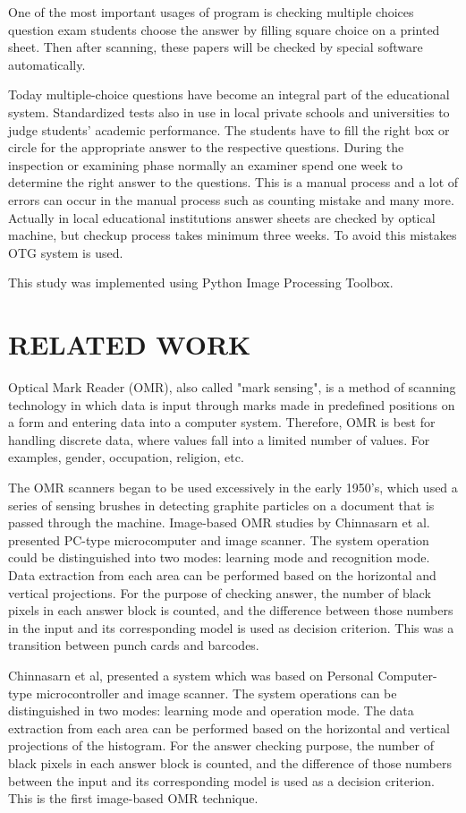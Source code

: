 \documentclass[a4paper,10pt]{article}
\begin{document}
One of the most important usages of program is checking multiple choices question exam students choose the answer by filling square choice on a printed sheet. Then after scanning, these papers will be checked by special software automatically.

Today multiple-choice questions have become an integral part of the educational system. Standardized tests also in use in local private schools and universities to judge students' academic performance. The students have to fill the right box or circle for the appropriate answer to the respective questions. During the inspection or examining phase normally an examiner spend one week to determine the right answer to the questions. This is a manual process and a lot of errors can occur in the manual process such as counting mistake and many more. Actually in local educational institutions answer sheets are checked by optical machine, but checkup process takes minimum three weeks. To avoid this mistakes OTG system is used.

This study was implemented using Python Image Processing Toolbox.
\section{RELATED WORK}
Optical Mark Reader (OMR), also called "mark sensing", is a method of scanning technology in which data is input through marks made in predefined positions on a form and entering data into a computer system. Therefore, OMR is best for handling discrete data, where values fall into a limited number of values. For examples, gender, occupation, religion, etc.

The OMR scanners began to be used excessively in the early 1950’s, which used a series of sensing brushes in detecting graphite particles on a document that is passed through the machine. Image-based OMR studies by Chinnasarn et al. presented PC-type microcomputer and image scanner. The system operation could be distinguished into two modes: learning mode and recognition mode. Data extraction from each area can be performed based on the horizontal and vertical projections. For the purpose of checking answer, the number of black pixels in each answer block is counted, and the difference between those numbers in the input and its corresponding model is used as decision criterion. This was a transition between punch cards and barcodes.

Chinnasarn et al, presented a system which was based on Personal Computer-type microcontroller and image scanner. The system operations can be distinguished in two modes: learning mode and operation mode. The data extraction from each area can be performed based on the horizontal and vertical projections of the histogram. For the answer checking purpose, the number of black pixels in each answer block is counted, and the difference of those numbers between the input and its corresponding model is used as a decision criterion. This is the first image-based OMR technique.
\end{document}
